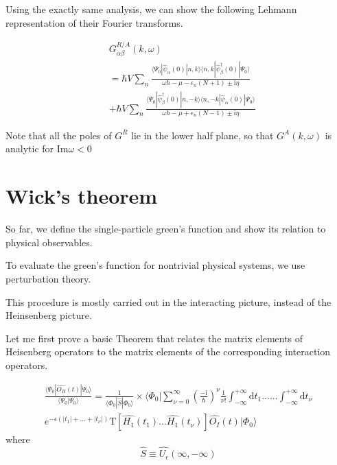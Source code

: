 ﻿\documentclass[twoside]{book}
\numberwithin{equation}{section}
\begin{document}
Using the exactly same analysis, we can show the following Lehmann representation of their Fourier transforms.

\begin{align}\label{2.3.15}
& G^{R/A}_{\alpha\beta}(k,\omega) \nonumber \\
&=\hbar V\sum_n \frac{\langle\Psi_0|\hat \psi_{\alpha}(0)|n,k\rangle\langle n,k|\hat \psi^{
\dagger}_{\beta} (0)|\Psi_0\rangle}{\omega\hbar-\mu-\epsilon_n(N+1)\pm\mathrm{i}\eta}  \nonumber \\
&+\hbar V\sum_n \frac{\langle\Psi_0|\hat \psi^{
\dagger}_{\beta} (0)|n,-k\rangle\langle n,-k|\hat \psi_{\alpha}(0)|\Psi_0\rangle}{\omega\hbar-\mu+\epsilon_n(N-1)\pm\mathrm{i}\eta} \nonumber\tag{2.3.15A/B} 
\end{align}

Note that all the poles of $G^R$ lie in the lower half plane, so that $G^A(k,\omega)$ is analytic for $\mathrm{Im} \omega<0$



\section{Wick's theorem}

So far, we define the single-particle green's function and show its relation to physical observables.

To evaluate the green's function for nontrivial physical systems, we use perturbation theory.

This procedure is mostly carried out in the interacting picture, instead of the Heinsenberg picture.

Let me first prove a basic Theorem that relates the matrix elements of Heisenberg operators to the matrix elements of the corresponding interaction operators.


\begin{align}\label{2.4.1}
\frac{\langle\Psi_0|\hat{O_H}(t)|\Psi_0\rangle}{\langle\Psi_0|\Psi_0\rangle}=\frac{1}{\langle\Phi_0|\hat{S}|\Phi_0\rangle}\times \langle\Phi_0|\sum_{\nu=0}^{\infty}(\frac{-\mathrm{i}}{\hbar})^{\nu} \frac{1}{\nu!} \int_{-\infty}^{+\infty}\mathrm{d}t_1......\int_{-\infty}^{+\infty}\mathrm{d}t_{\nu} \nonumber \\
e^{-\epsilon(|t_1|+...+|t_{\nu}|)}\mathrm{T}[\hat{H_1}(t_1)...\hat{H_1}(t_{\nu})]\hat{O_I}(t)|\Phi_0\rangle
\end{align}
where 
\begin{equation}\label{2.4.2}
\hat{S}\equiv\hat{U_{\epsilon}}(\infty,-\infty)
\end{equation}
\end{document}
